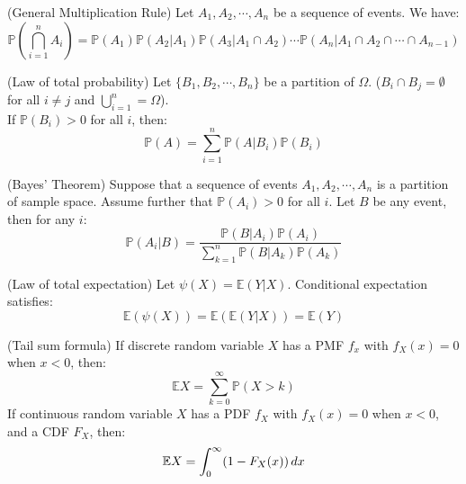 \documentclass{huhtakm-template-book}
\newcommand{\prob}{\mathbb{P}}
\newcommand{\expect}{\mathbb{E}}
\begin{document}
\begin{spro}(General Multiplication Rule)
	Let $A_{1},A_{2},\cdots,A_{n}$ be a sequence of events. We have:
	\begin{equation*}
		\prob\left(\bigcap_{i=1}^{n}A_{i}\right)=\prob(A_{1})\prob(A_{2}|A_{1})\prob(A_{3}|A_{1}\cap A_{2})\cdots\prob(A_{n}|A_{1}\cap A_{2}\cap\cdots\cap A_{n-1})
	\end{equation*}
\end{spro}
\begin{spro}(Law of total probability)
	Let $\{B_{1},B_{2},\cdots,B_{n}\}$ be a partition of $\Omega$. ($B_{i}\cap B_{j}=\emptyset$ for all $i\neq j$ and $\bigcup_{i=1}^{n}=\Omega$).\\
	If $\prob(B_{i})>0$ for all $i$, then:
	\begin{equation*}
		\prob(A)=\sum_{i=1}^{n}\prob(A|B_{i})\prob(B_{i})
	\end{equation*}
\end{spro}
\begin{spro}(Bayes' Theorem)
	Suppose that a sequence of events $A_{1},A_{2},\cdots,A_{n}$ is a partition of sample space. Assume further that $\prob(A_{i})>0$ for all $i$. Let $B$ be any event, then for any $i$:
	\begin{equation*}
		\prob(A_{i}|B)=\frac{\prob(B|A_{i})\prob(A_{i})}{\sum_{k=1}^{n}\prob(B|A_{k})\prob(A_{k})}
	\end{equation*}
\end{spro}
\begin{spro}(Law of total expectation)
	Let $\psi(X)=\expect(Y|X)$. Conditional expectation satisfies:
	\begin{equation*}
		\expect(\psi(X))=\expect(\expect(Y|X))=\expect(Y)
	\end{equation*}
\end{spro}
\begin{spro}(Tail sum formula)
	If discrete random variable $X$ has a PMF $f_{x}$ with $f_{X}(x)=0$ when $x<0$, then:
	\begin{equation*}
		\expect{X}=\sum_{k=0}^{\infty}\prob(X>k)
	\end{equation*}
	If continuous random variable $X$ has a PDF $f_{X}$ with $f_{X}(x)=0$ when $x<0$, and a CDF $F_{X}$, then:
	\begin{equation*}
		\expect X=\intlu{0}{\infty}(1-F_{X}(x))\,dx
	\end{equation*}
\end{spro}

\newpage
\end{document}

